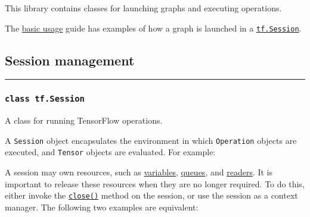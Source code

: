 This library contains classes for launching graphs and executing
operations.

The \href{../../get_started/introduction.md\#basic-usage}{basic usage}
guide has examples of how a graph is launched in a
\protect\hyperlink{Session}{\texttt{tf.Session}}.

\subsection{Session management }\label{session-management}

\begin{center}\rule{0.5\linewidth}{\linethickness}\end{center}

\subsubsection{\texorpdfstring{\texttt{class\ tf.Session}
}{class tf.Session }}\label{class-tf.session}

A class for running TensorFlow operations.

A \texttt{Session} object encapsulates the environment in which
\texttt{Operation} objects are executed, and \texttt{Tensor} objects are
evaluated. For example:

\begin{Shaded}
\begin{Highlighting}[]
\OperatorTok{=} \NormalTok{)}
\OperatorTok{=} \NormalTok{)}
\OperatorTok{=} \OperatorTok{*} 

\OperatorTok{=} 

 
\end{Highlighting}
\end{Shaded}

A session may own resources, such as
\href{../../api_docs/python/state_ops.md\#Variable}{variables},
\href{../../api_docs/python/io_ops.md\#QueueBase}{queues}, and
\href{../../api_docs/python/io_ops.md\#ReaderBase}{readers}. It is
important to release these resources when they are no longer required.
To do this, either invoke the
\protect\hyperlink{Session.close}{\texttt{close()}} method on the
session, or use the session as a context manager. The following two
examples are equivalent:


